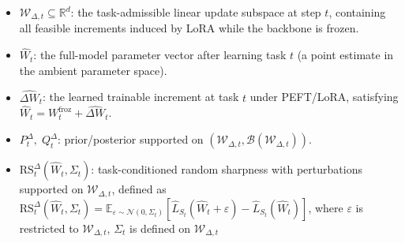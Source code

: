 \documentclass{article}
\theoremstyle{plain}
\theoremstyle{definition}
\theoremstyle{remark}
\begin{document}
\begin{itemize}


\item $\mathcal W_{\Delta,t}\subseteq\mathbb R^d$: the task-admissible linear update subspace at step $t$, containing all feasible increments induced by LoRA while the backbone is frozen.


\item $\widehat W_t$: the full-model parameter vector after learning task $t$ (a point estimate in the ambient parameter space).
\item $\widehat{\Delta W}_t$: the learned trainable increment at task $t$ under PEFT/LoRA, satisfying $\widehat W_t = W_t^{\mathrm{froz}} + \widehat{\Delta W}_t$.

 


 
\item $P_t^\Delta,\;Q_t^\Delta$: prior/posterior supported on $(\mathcal W_{\Delta,t},\mathcal B(\mathcal W_{\Delta,t}))$.




\item $\mathrm{RS}_t^\Delta(\widehat W_t,\Sigma_t)$: task-conditioned random sharpness with perturbations supported on $\mathcal W_{\Delta,t}$, defined as
$\mathrm{RS}_t^\Delta(\widehat W_t,\Sigma_t)=\mathbb E_{\varepsilon\sim\mathcal N(0,\Sigma_t)}[\hat L_{S_t}(\widehat W_t+\varepsilon)-\hat L_{S_t}(\widehat W_t)]$,
where $\varepsilon$ is restricted to $\mathcal W_{\Delta,t}$, $\Sigma_t$ is defined on $\mathcal{W}_{\Delta,t}$



\end{itemize}
\end{document}
